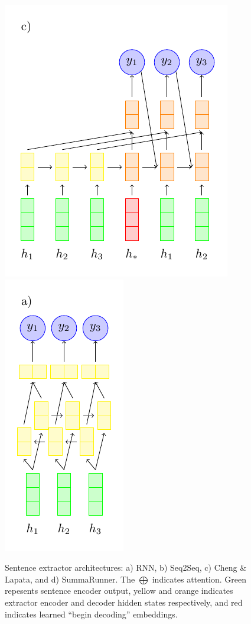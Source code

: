 \begin{figure}
  \includegraphics[scale=.7]{figures/clextractor.pdf}
  \includegraphics[scale=.7]{figures/rnnextractor.pdf}
  \caption{Sentence extractor architectures: a) RNN, b) Seq2Seq,
  c) Cheng \& Lapata, and d) SummaRunner. The $\bigoplus$ indicates 
  attention. Green repesents sentence encoder output, yellow and orange
  indicates
  extractor encoder and decoder hidden states respectively, and red indicates
  learned ``begin decoding'' embeddings. }
  \label{fig:extractors}
\end{figure}




